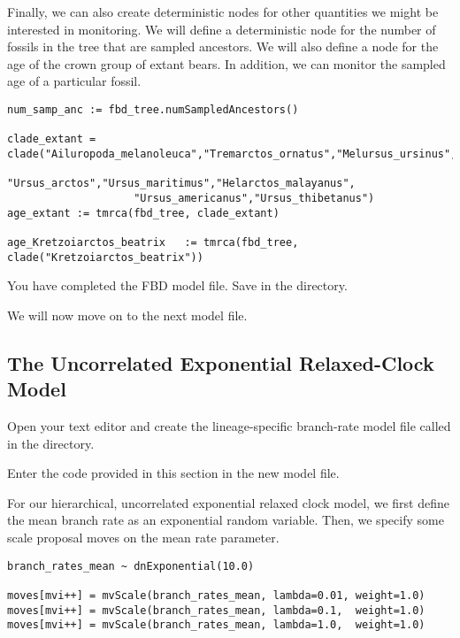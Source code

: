 Finally, we can also create deterministic nodes for other quantities we might be interested in monitoring. 
We will define a deterministic node for the number of fossils in the tree that are sampled ancestors. 
We will also define a node for the age of the crown group of extant bears.
In addition, we can monitor the sampled age of a particular fossil.

{\tt \begin{snugshade*}
\begin{lstlisting}
num_samp_anc := fbd_tree.numSampledAncestors()

clade_extant = clade("Ailuropoda_melanoleuca","Tremarctos_ornatus","Melursus_ursinus",
                    "Ursus_arctos","Ursus_maritimus","Helarctos_malayanus",
                    "Ursus_americanus","Ursus_thibetanus")
age_extant := tmrca(fbd_tree, clade_extant)

age_Kretzoiarctos_beatrix   := tmrca(fbd_tree, clade("Kretzoiarctos_beatrix"))
\end{lstlisting}
\end{snugshade*}}

{\begin{framed}
You have completed the FBD model file. Save  in the  directory.

We will now move on to the next model file.
\end{framed}}


\bigskip

\subsection{The Uncorrelated Exponential Relaxed-Clock Model}\label{subsect:RB-ModelUCExp}

{\begin{framed}
Open your text editor and create the lineage-specific branch-rate model file called {\textcolor{red}{}} in the  directory.

Enter the \Rev code provided in this section in the new model file.
\end{framed}}

For our hierarchical, uncorrelated exponential relaxed clock model, we first define the mean branch rate as an exponential random variable. Then, we specify some scale proposal moves on the mean rate parameter.
{\tt \begin{snugshade*}
\begin{lstlisting}
branch_rates_mean ~ dnExponential(10.0)

moves[mvi++] = mvScale(branch_rates_mean, lambda=0.01, weight=1.0)
moves[mvi++] = mvScale(branch_rates_mean, lambda=0.1,  weight=1.0)
moves[mvi++] = mvScale(branch_rates_mean, lambda=1.0,  weight=1.0)
\end{lstlisting}
\end{snugshade*}}

